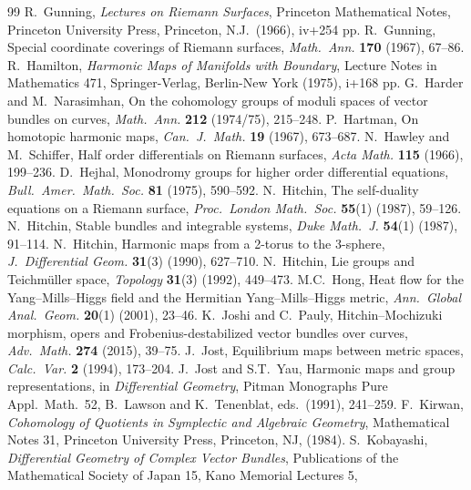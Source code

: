\begin{thebibliography}{99}
 R.~Gunning, \emph{Lectures on Riemann Surfaces}, Princeton
Mathematical Notes, Princeton University Press, Princeton, N.J.\ (1966), iv+254 pp.
 R.~Gunning, Special coordinate coverings of Riemann surfaces,
\emph{Math.\ Ann.} \textbf{170} (1967), 67--86.
 R.~Hamilton, \emph{Harmonic Maps of Manifolds with Boundary},
Lecture Notes in Mathematics 471, Springer-Verlag, Berlin-New York (1975), i+168 pp.
 G.~Harder and M.~Narasimhan, On the cohomology groups of
moduli spaces of vector bundles on curves, \emph{Math.\ Ann.} \textbf{212} (1974/75),
215--248.
 P.~Hartman, On homotopic harmonic maps, \emph{Can.\ J.\ Math.}
\textbf{19} (1967), 673--687.
 N.~Hawley and M.~Schiffer, Half order differentials on
Riemann surfaces, \emph{Acta Math.} \textbf{115} (1966), 199--236.
 D.~Hejhal, Monodromy groups for higher order differential
equations, \emph{Bull.\ Amer.\ Math.\ Soc.} \textbf{81} (1975), 590--592.
 N.~Hitchin, The self-duality equations on a Riemann surface,
\emph{Proc.\ London Math.\ Soc.} \textbf{55}(1) (1987), 59--126.
 N.~Hitchin, Stable bundles and integrable systems,
\emph{Duke Math.\ J.} \textbf{54}(1) (1987), 91--114.
 N.~Hitchin, Harmonic maps from a 2-torus to the 3-sphere,
\emph{J.\ Differential Geom.} \textbf{31}(3) (1990), 627--710.
 N.~Hitchin, Lie groups and Teichm\"{u}ller space,
\emph{Topology} \textbf{31}(3) (1992), 449--473.
 M.C.~Hong, Heat flow for the Yang--Mills--Higgs field and the
Hermitian Yang--Mills--Higgs metric, \emph{Ann.\ Global Anal.\ Geom.} \textbf{20}(1)
(2001), 23--46.
 K.~Joshi and C.~Pauly, Hitchin--Mochizuki morphism, opers and
Frobenius-destabilized vector bundles over curves, \emph{Adv.\ Math.} \textbf{274}
(2015), 39--75.
 J.~Jost, Equilibrium maps between metric spaces, \emph{Calc.\ Var.}
\textbf{2} (1994), 173--204.
 J.~Jost and S.T.~Yau, Harmonic maps and group representations, in
\emph{Differential Geometry}, Pitman Monographs Pure Appl.\ Math.\ 52, B.~Lawson and
K.~Tenenblat, eds.\ (1991), 241--259.
 F.~Kirwan, \emph{Cohomology of Quotients in Symplectic and
Algebraic Geometry}, Mathematical Notes 31, Princeton University Press, Princeton, NJ,
(1984).
 S.~Kobayashi, \emph{Differential Geometry of Complex Vector
Bundles}, Publications of the Mathematical Society of Japan 15, Kano Memorial Lectures 5,

\end{thebibliography}
